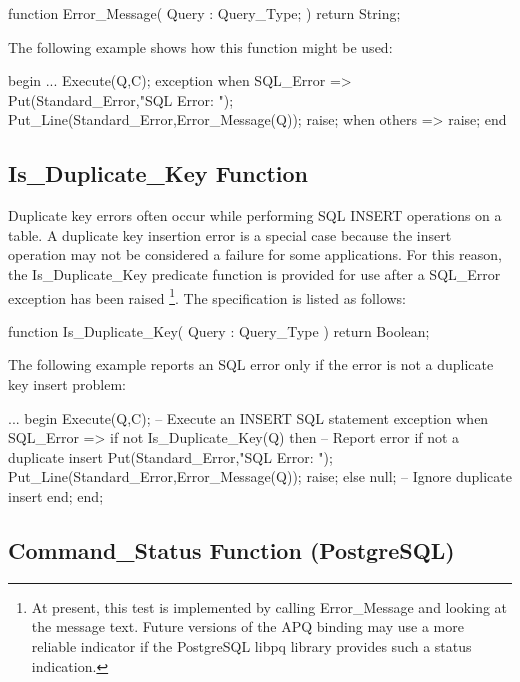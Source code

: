 \documentclass[english,letterpaper]{book}
\begin{document}
\begin{Code}
function Error_Message(
   Query : Query_Type;
) return String;
\end{Code}

The following example shows how this function might be used:

\begin{Example}
begin
   ...
   Execute(Q,C);
exception
   when SQL_Error =>
      Put(Standard_Error,"SQL Error: ");
      Put_Line(Standard_Error,Error_Message(Q));
      raise;
   when others =>
      raise;
end
\end{Example}

\subsection{Is\_Duplicate\_Key Function}

Duplicate key errors often occur while performing SQL INSERT operations
on a table. A duplicate key insertion error is a special case because
the insert operation may not be considered a failure for some applications.
For this reason, the Is\_Duplicate\_Key predicate function is provided
for use after a SQL\_Error exception has been raised%
\footnote{At present, this test is implemented by calling Error\_Message and
looking at the message text. Future versions of the APQ binding may
use a more reliable indicator if the PostgreSQL libpq library provides
such a status indication.%
}. The specification is listed as follows:

\begin{Code}
function Is_Duplicate_Key(
   Query : Query_Type
) return Boolean;
\end{Code}

The following example reports an SQL error only if the error is not
a duplicate key insert problem:

\begin{Example}
...
begin
   Execute(Q,C);  -- Execute an INSERT SQL statement
exception
   when SQL_Error =>
      if not Is_Duplicate_Key(Q) then
         -- Report error if not a duplicate insert
         Put(Standard_Error,"SQL Error: ");
         Put_Line(Standard_Error,Error_Message(Q));
         raise;
      else
         null; -- Ignore duplicate insert
      end;
end;
\end{Example}

\subsection{Command\_Status Function (PostgreSQL)\label{Command_Status Function}}
\end{document}

